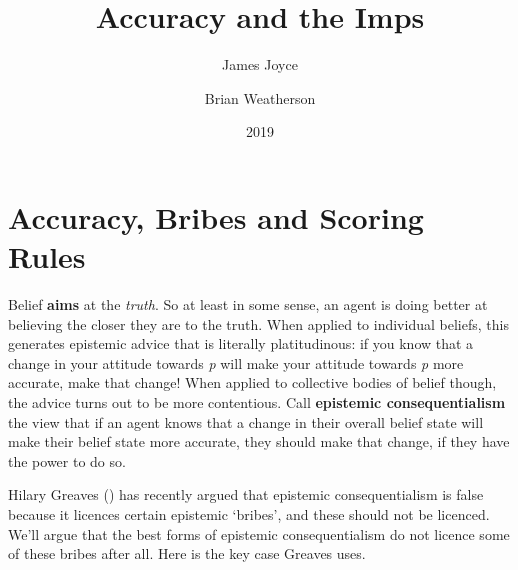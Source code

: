\documentclass[
  11pt,
  letterpaper,
  DIV=11,
  numbers=noendperiod,
  oneside]{scrartcl}
\title{Accuracy and the Imps}
\author{James Joyce \and Brian Weatherson}
\date{2019}
\begin{document}
\maketitle

\section{Accuracy, Bribes and Scoring
Rules}\label{accuracybribesandscoringrules}

Belief \textbf{aims} at the \emph{truth}. So at least in some sense, an
agent is doing better at believing the closer they are to the truth.
When applied to individual beliefs, this generates epistemic advice that
is literally platitudinous: if you know that a change in your attitude
towards \emph{p} will make your attitude towards \emph{p} more accurate,
make that change! When applied to collective bodies of belief though,
the advice turns out to be more contentious. Call \textbf{epistemic
consequentialism} the view that if an agent knows that a change in their
overall belief state will make their belief state more accurate, they
should make that change, if they have the power to do so.

Hilary Greaves () has recently argued
that epistemic consequentialism is false because it licences certain
epistemic `bribes', and these should not be licenced. We'll argue that
the best forms of epistemic consequentialism do not licence some of
these bribes after all. Here is the key case Greaves
uses.
\end{document}
